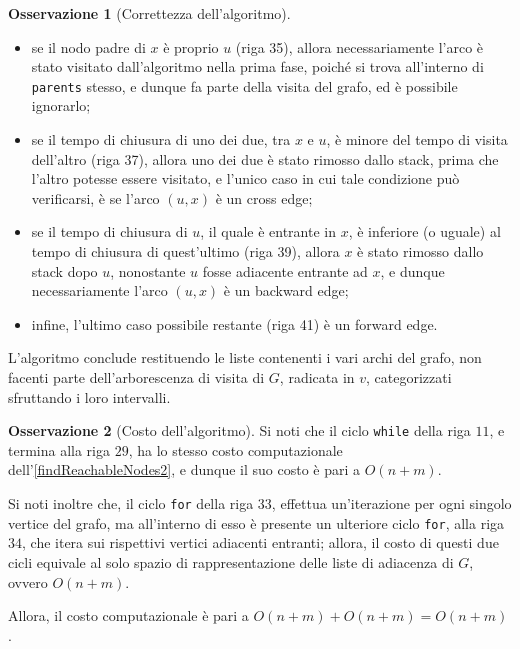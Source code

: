 \documentclass[14pt]{extreport}
\theoremstyle{definition}
\theoremstyle{definition}
\newtheorem{remark}{Osservazione}[subsection]
\begin{document}
\begin{remark}[Correttezza dell'algoritmo]
    \begin{itemize}
        \item se il nodo padre di $x$ è proprio $u$ (riga 35), allora necessariamente l'arco è stato visitato dall'algoritmo nella prima fase, poiché si trova all'interno di \texttt{parents} stesso, e dunque fa parte della visita del grafo, ed è possibile ignorarlo;
        \item se il tempo di chiusura di uno dei due, tra $x$ e $u$, è minore del tempo di visita dell'altro (riga 37), allora uno dei due è stato rimosso dallo stack, prima che l'altro potesse essere visitato, e l'unico caso in cui tale condizione può verificarsi, è se l'arco $(u, x)$ è un cross edge;
        \item se il tempo di chiusura di $u$, il quale è entrante in $x$, è inferiore (o uguale) al tempo di chiusura di quest'ultimo (riga 39), allora $x$ è stato rimosso dallo stack dopo $u$, nonostante $u$ fosse adiacente entrante ad $x$, e dunque necessariamente l'arco $(u, x)$ è un backward edge;
        \item infine, l'ultimo caso possibile restante (riga 41) è un forward edge.
    \end{itemize}

    L'algoritmo conclude restituendo le liste contenenti i vari archi del grafo, non facenti parte dell'arborescenza di visita di $G$, radicata in $v$, categorizzati sfruttando i loro intervalli.
\end{remark}

\begin{remark}[Costo dell'algoritmo]
    Si noti che il ciclo \texttt{while} della riga $11$, e termina alla riga $29$, ha lo stesso costo computazionale dell'\cref{findReachableNodes2}, e dunque il suo costo è pari a $O(n + m)$.

    Si noti inoltre che, il ciclo \texttt{for} della riga $33$, effettua un'iterazione per ogni singolo vertice del grafo, ma all'interno di esso è presente un ulteriore ciclo \texttt{for}, alla riga $34$, che itera sui rispettivi vertici adiacenti entranti; allora, il costo di questi due cicli equivale al solo spazio di rappresentazione delle liste di adiacenza di $G$, ovvero $O(n + m)$.

    Allora, il costo computazionale è pari a $O(n + m) + O(n + m) = O(n + m)$.
\end{remark}
\end{document}
